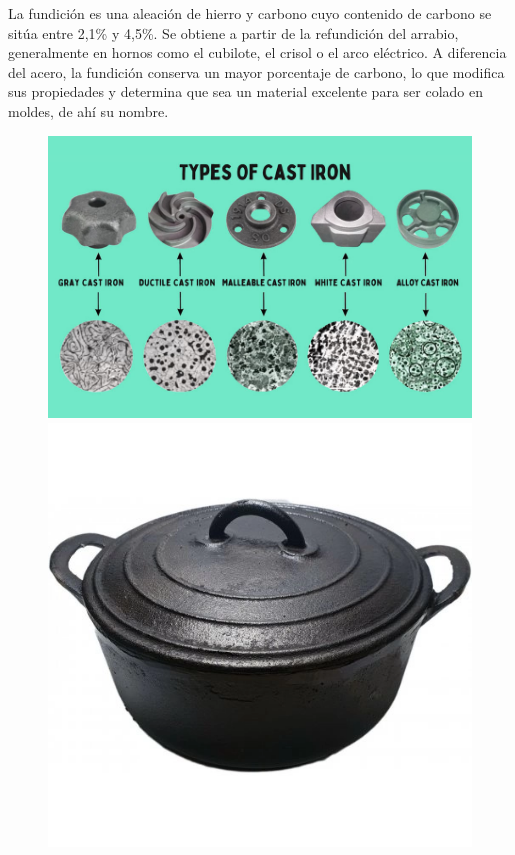 \documentclass[12pt,a4paper]{article}
\begin{document}
 La fundición es una aleación de hierro y carbono cuyo contenido de carbono se sitúa entre 2,1\% y 4,5\%. Se obtiene a partir de la refundición del arrabio, generalmente en hornos como el cubilote, el crisol o el arco eléctrico. A diferencia del acero, la fundición conserva un mayor porcentaje de carbono, lo que modifica sus propiedades y determina que sea un material excelente para ser colado en moldes, de ahí su nombre.

\begin{figure}[H]
    \centering
    \begin{minipage}{0.47\textwidth}
        \centering
        \includegraphics[width=\textwidth]{Inagenes para latex/Fundicion.png}
    \end{minipage}
    \begin{minipage}{0.47\textwidth}
        \centering
        \includegraphics[width=\textwidth]{Inagenes para latex/fundicion 4.png}
    \end{minipage}
\end{figure}
 
\end{document}
